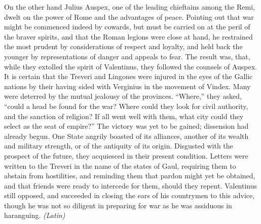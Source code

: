 
On the other hand Julius Auspex, one of the leading chieftains among the Remi, dwelt on the power of Rome and the advantages of peace. Pointing out that war might be commenced indeed by cowards, but must be carried on at the peril of the braver spirits, and that the Roman legions were close at hand, he restrained the most prudent by considerations of respect and loyalty, and held back the younger by representations of danger and appeals to fear. The result was, that, while they extolled the spirit of Valentinus, they followed the counsels of Auspex. It is certain that the Treveri and Lingones were injured in the eyes of the Gallic nations by their having sided with Verginius in the movement of Vindex. Many were deterred by the mutual jealousy of the provinces. ``Where,'' they asked, ``could a head be found for the war? Where could they look for civil authority, and the sanction of religion? If all went well with them, what city could they select as the seat of empire?'' The victory was yet to be gained; dissension had already begun. One State angrily boasted of its alliances, another of its wealth and military strength, or of the antiquity of its origin. Disgusted with the prospect of the future, they acquiesced in their present condition. Letters were written to the Treveri in the name of the states of Gaul, requiring them to abstain from hostilities, and reminding them that pardon might yet be obtained, and that friends were ready to intercede for them, should they repent. Valentinus still opposed, and succeeded in closing the ears of his countrymen to this advice, though he was not so diligent in preparing for war as he was assiduous in haranguing. \emph{(Latin)}



